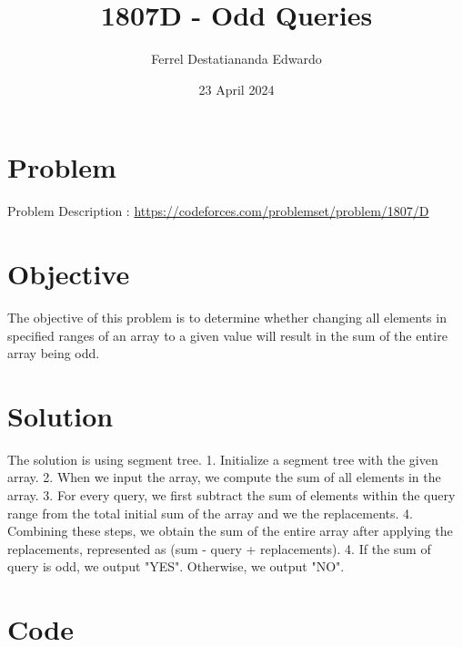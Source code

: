 \documentclass{article}
\title{1807D - Odd Queries}
\author{Ferrel Destatiananda Edwardo}
\date{23 April 2024}
\begin{document}
\maketitle


\section{Problem}

Problem Description : \href{https://codeforces.com/problemset/problem/1807/D}{https://codeforces.com/problemset/problem/1807/D}

\section{Objective}

The objective of this problem is to determine whether changing all elements in specified ranges of an array to a given value will result in the sum of the entire array being odd.

\section{Solution}
The solution is using segment tree.
1. Initialize a segment tree with the given array.
2. When we input the array, we compute the sum of all elements in the array.
3. For every query, we first subtract the sum of elements within the query range from the total initial sum of the array and we the replacements.
4. Combining these steps, we obtain the sum of the entire array after applying the replacements, represented as (sum - query + replacements).
4. If the sum of query is odd, we output "YES". Otherwise, we output "NO".


\newpage
\section{Code}
\end{document}
